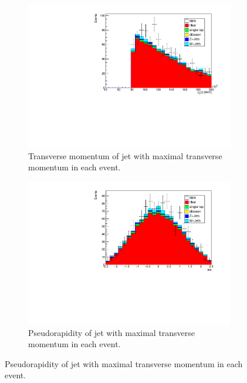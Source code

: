 \begin{figure}[H]
  \begin{subfigure}{0.45\textwidth}%
    \centering%
    \includegraphics[width=\textwidth]{plots/comparism/jet_pt_max.pdf}%
    \caption{Transverse momentum of jet with maximal transverse momentum in each event.}%
    \label{fig:6e}%
  \end{subfigure}%
  \hfill
  \begin{subfigure}{0.45\textwidth}%
    \centering%
    \includegraphics[width=\textwidth]{plots/comparism/jet_eta_max.pdf}%
    \caption{Pseudorapidity of jet with maximal transverse momentum in each event.}%
    \label{fig:6f}%
  \end{subfigure}%


\end{figure}
